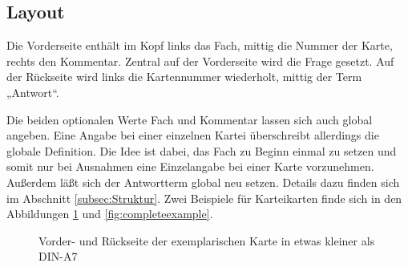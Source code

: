 \documentclass[a4paper,DIV=calc]{scrartcl}
\begin{document}
\subsection{Layout}
Die Vorderseite enthält im Kopf links das Fach, mittig die Nummer der Karte, rechts den Kommentar. Zentral auf der Vorderseite wird die Frage gesetzt. Auf der Rückseite wird links die Kartennummer wiederholt, mittig der Term „Antwort“.

Die beiden optionalen Werte Fach und Kommentar lassen sich auch global angeben. Eine Angabe bei einer einzelnen Kartei überschreibt allerdings die globale Definition. Die Idee ist dabei, das Fach zu Beginn einmal zu setzen und somit nur bei Ausnahmen eine Einzelangabe bei einer Karte vorzunehmen. Außerdem läßt sich der Antwortterm global neu setzen. Details dazu finden sich im Abschnitt \ref{subsec:Struktur}. Zwei Beispiele für Karteikarten finde sich in den Abbildungen \ref{fig:example} und \ref{fig:completeexample}.
\begin{figure}
	\quad	{}
	\caption{Vorder- und Rückseite der exemplarischen Karte in etwas kleiner als DIN-A7}\label{fig:example}
\end{figure}
\end{document}
